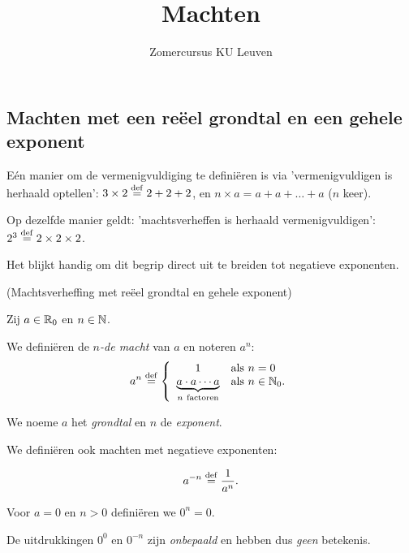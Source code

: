 \documentclass{ximera}
\author{Zomercursus KU Leuven}
\title[Rekenvaardigheden:]{Machten}
\begin{document}
\begin{abstract}
	
\end{abstract}
\maketitle

\subsection{Machten met een re\"eel grondtal en een gehele exponent}

Eén manier om de vermenigvuldiging te definiëren is via 'vermenigvuldigen is herhaald optellen': $3\times 2 \overset{\mathrm{def}}{=} 2 + 2+ 2$, en $n\times a = a+a+\dots +a$ ($n$ keer). 

Op dezelfde manier geldt: 'machtsverheffen is herhaald vermenigvuldigen': $2^3 \overset{\mathrm{def}}{=} 2\times2\times2$. 

Het blijkt handig om dit begrip direct uit te breiden tot negatieve exponenten. 

\begin{definition}(Machtsverheffing met re\"eel grondtal en gehele exponent) \ 
	
	Zij $a\in\mathbb{R}_0$ en $n\in\mathbb{N}$. 
	
	We definiëren de \emph{$n$-de macht}  van $a$ en noteren $a^n$:
	\[a^n\overset{\mathrm{def}}{=}
	\left\{
	\begin{array}{cl}
	1 & \textrm{als }n=0 \\
	\underbrace{a\cdot a\cdots a}_{n\mathrm{\ factoren}} & \textrm{als }n\in\mathbb{N}_0. \\
	\end{array}
	\right.\]
	
	We noeme $a$ het \textit{grondtal} en $n$ de \textit{exponent}.
		
	We definiëren ook machten met negatieve exponenten:
	
	\[a^{-n}\overset{\mathrm{def}}{=}\frac{1}{a^n}.\]
	
	Voor $a=0$ en $n>0$ definiëren we $0^n = 0$. 
	
	De uitdrukkingen $0^0$ en $0^{-n}$ zijn \textit{onbepaald} en hebben dus \textit{geen} betekenis.
	
\end{definition}
\end{document}
